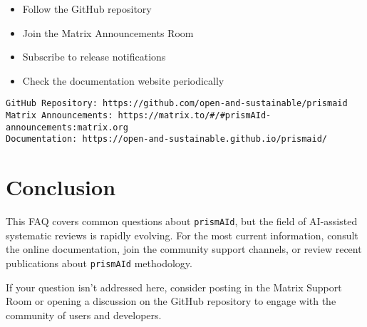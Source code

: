 \begin{itemize}
    \item Follow the GitHub repository
    \item Join the Matrix Announcements Room
    \item Subscribe to release notifications
    \item Check the documentation website periodically
\end{itemize}

\begin{commandbox}
\begin{lstlisting}
GitHub Repository: https://github.com/open-and-sustainable/prismaid
Matrix Announcements: https://matrix.to/#/#prismAId-announcements:matrix.org
Documentation: https://open-and-sustainable.github.io/prismaid/
\end{lstlisting}
\end{commandbox}

\section{Conclusion}

This FAQ covers common questions about \texttt{prismAId}, but the field of AI-assisted systematic reviews is rapidly evolving. For the most current information, consult the online documentation, join the community support channels, or review recent publications about \texttt{prismAId} methodology.

If your question isn't addressed here, consider posting in the Matrix Support Room or opening a discussion on the GitHub repository to engage with the community of users and developers.
